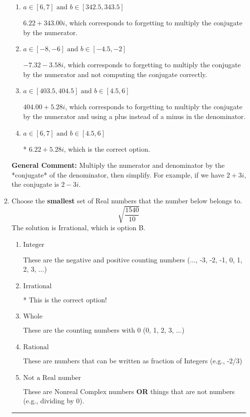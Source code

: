 \documentclass{extbook}[14pt]
\newcommand{\litem}[1]{\item #1

\rule{\textwidth}{0.4pt}}
\begin{document}
\begin{enumerate}
{\begin{enumerate}[label=\Alph*.]
 $-36.00  + 6.88 i$, which corresponds to just dividing the first term by the first term and the second by the second.
\item \( a \in [6, 7] \text{ and } b \in [342.5, 343.5] \)

 $6.22  + 343.00 i$, which corresponds to forgetting to multiply the conjugate by the numerator.
\item \( a \in [-8, -6] \text{ and } b \in [-4.5, -2] \)

 $-7.32  - 3.58 i$, which corresponds to forgetting to multiply the conjugate by the numerator and not computing the conjugate correctly.
\item \( a \in [403.5, 404.5] \text{ and } b \in [4.5, 6] \)

 $404.00  + 5.28 i$, which corresponds to forgetting to multiply the conjugate by the numerator and using a plus instead of a minus in the denominator.
\item \( a \in [6, 7] \text{ and } b \in [4.5, 6] \)

* $6.22  + 5.28 i$, which is the correct option.
\end{enumerate}

\textbf{General Comment:} Multiply the numerator and denominator by the *conjugate* of the denominator, then simplify. For example, if we have $2+3i$, the conjugate is $2-3i$.
}
\litem{
Choose the \textbf{smallest} set of Real numbers that the number below belongs to.
\[ \sqrt{\frac{1540}{10}} \]The solution is \( \text{Irrational} \), which is option B.\begin{enumerate}[label=\Alph*.]
\item \( \text{Integer} \)

These are the negative and positive counting numbers (..., -3, -2, -1, 0, 1, 2, 3, ...)
\item \( \text{Irrational} \)

* This is the correct option!
\item \( \text{Whole} \)

These are the counting numbers with 0 (0, 1, 2, 3, ...)
\item \( \text{Rational} \)

These are numbers that can be written as fraction of Integers (e.g., -2/3)
\item \( \text{Not a Real number} \)

These are Nonreal Complex numbers \textbf{OR} things that are not numbers (e.g., dividing by 0).
\end{enumerate}

}
\end{enumerate}
\end{document}
